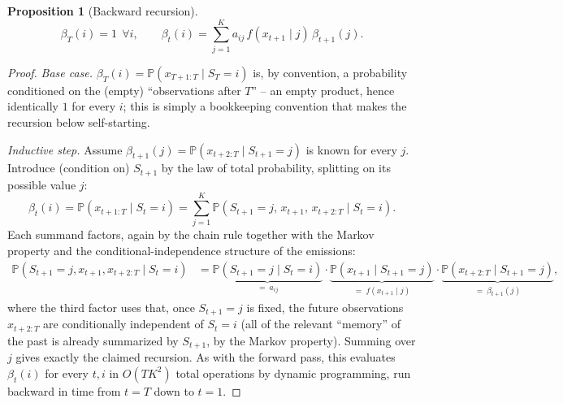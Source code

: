 \documentclass[11pt]{article}
\newtheorem{proposition}[theorem]{Proposition}
\theoremstyle{definition}
\theoremstyle{remark}
\begin{document}
\begin{proposition}[Backward recursion]
\[
\beta_T(i)=1\ \ \forall i, \qquad
\beta_t(i) = \sum_{j=1}^K a_{ij}\,f(x_{t+1}\mid j)\,\beta_{t+1}(j).
\]
\end{proposition}
\begin{proof}
\emph{Base case.} $\beta_T(i)=\mathbb{P}(x_{T+1:T}\mid S_T=i)$ is, by convention, a probability conditioned on the (empty) ``observations after $T$'' -- an empty product, hence identically $1$ for every $i$; this is simply a bookkeeping convention that makes the recursion below self-starting.

\emph{Inductive step.} Assume $\beta_{t+1}(j)=\mathbb{P}(x_{t+2:T}\mid S_{t+1}=j)$ is known for every $j$. Introduce (condition on) $S_{t+1}$ by the law of total probability, splitting on its possible value $j$:
\[
\beta_t(i) = \mathbb{P}(x_{t+1:T}\mid S_t=i) = \sum_{j=1}^K \mathbb{P}(S_{t+1}=j,\,x_{t+1},\,x_{t+2:T}\mid S_t=i).
\]
Each summand factors, again by the chain rule together with the Markov property and the conditional-independence structure of the emissions:
\begin{align*}
\mathbb{P}(S_{t+1}=j,x_{t+1},x_{t+2:T}\mid S_t=i)
&= \underbrace{\mathbb{P}(S_{t+1}=j\mid S_t=i)}_{=\ a_{ij}}\cdot\underbrace{\mathbb{P}(x_{t+1}\mid S_{t+1}=j)}_{=\ f(x_{t+1}\mid j)}\cdot\underbrace{\mathbb{P}(x_{t+2:T}\mid S_{t+1}=j)}_{=\ \beta_{t+1}(j)},
\end{align*}
where the third factor uses that, once $S_{t+1}=j$ is fixed, the future observations $x_{t+2:T}$ are conditionally independent of $S_t=i$ (all of the relevant ``memory'' of the past is already summarized by $S_{t+1}$, by the Markov property). Summing over $j$ gives exactly the claimed recursion. As with the forward pass, this evaluates $\beta_t(i)$ for every $t,i$ in $O(TK^2)$ total operations by dynamic programming, run backward in time from $t=T$ down to $t=1$.
\end{proof}
\end{document}
